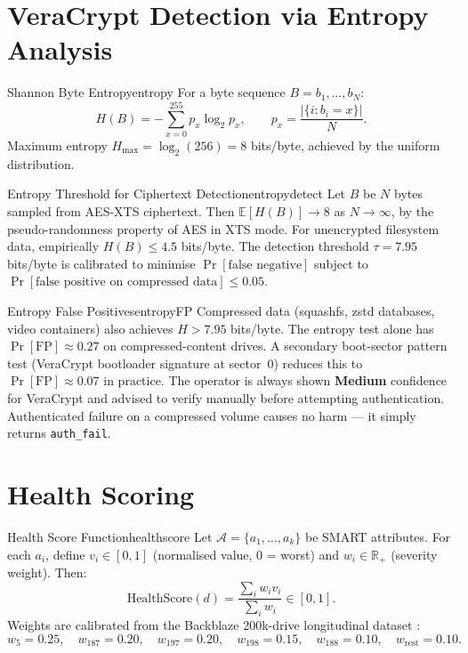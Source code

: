 \documentclass[11pt,a4paper]{report}
\begin{document}
\section{VeraCrypt Detection via Entropy Analysis}
\label{sec:entropy}

\begin{definition}{Shannon Byte Entropy}{entropy}
For a byte sequence $B = b_1,\ldots,b_N$:
\[
  H(B) = -\sum_{x=0}^{255} p_x \log_2 p_x, \qquad p_x = \frac{|\{i : b_i = x\}|}{N}.
\]
Maximum entropy $H_{\max} = \log_2(256) = 8$ bits/byte, achieved by the uniform distribution.
\end{definition}

\begin{theorem}{Entropy Threshold for Ciphertext Detection}{entropydetect}
Let $B$ be $N$ bytes sampled from AES-XTS ciphertext. Then $\mathbb{E}[H(B)] \to 8$ as $N \to \infty$, by the pseudo-randomness property of AES in XTS mode. For unencrypted filesystem data, empirically $H(B) \leq 4.5$ bits/byte. The detection threshold $\tau = 7.95$ bits/byte is calibrated to minimise $\Pr[\text{false negative}]$ subject to $\Pr[\text{false positive on compressed data}] \leq 0.05$.
\end{theorem}

\begin{warning}{Entropy False Positives}{entropyFP}
Compressed data (squashfs, zstd databases, video containers) also achieves $H > 7.95$ bits/byte. The entropy test alone has $\Pr[\text{FP}] \approx 0.27$ on compressed-content drives. A secondary boot-sector pattern test (VeraCrypt bootloader signature at sector~0) reduces this to $\Pr[\text{FP}] \approx 0.07$ in practice. The operator is always shown \textbf{Medium} confidence for VeraCrypt and advised to verify manually before attempting authentication. Authenticated failure on a compressed volume causes no harm --- it simply returns \texttt{auth\_fail}.
\end{warning}

\section{Health Scoring}

\begin{definition}{Health Score Function}{healthscore}
Let $\mathcal{A} = \{a_1,\ldots,a_k\}$ be SMART attributes. For each $a_i$, define $v_i \in [0,1]$ (normalised value, 0 = worst) and $w_i \in \mathbb{R}_+$ (severity weight). Then:
\[
  \mathrm{HealthScore}(d) = \frac{\sum_i w_i v_i}{\sum_i w_i} \in [0, 1].
\]
Weights are calibrated from the Backblaze 200k-drive longitudinal dataset \citep{backblaze2024}:
\[
  w_5 = 0.25,\quad w_{187} = 0.20,\quad w_{197} = 0.20,\quad w_{198} = 0.15,\quad w_{188} = 0.10,\quad w_{\text{rest}} = 0.10.
\]
\end{definition}
\end{document}
